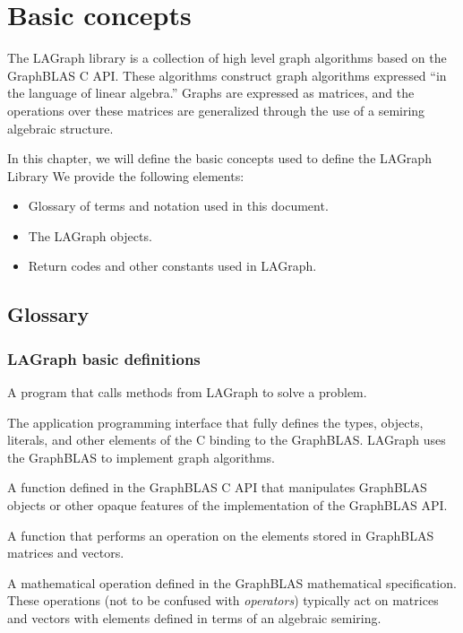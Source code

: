 \chapter{Basic concepts}
\label{Chp:Concepts}

The LAGraph library is a collection of high level graph algorithms
based on the GraphBLAS C API.  These algorithms construct  
graph algorithms expressed ``in the language of linear algebra.''
Graphs are expressed as matrices, and the operations over 
these matrices are generalized through the use of a
semiring algebraic structure.

In this chapter, we will define the basic concepts used to
define the LAGraph Library  We provide the following elements:

\begin{itemize}
\item Glossary of terms and notation used in this document.  
\item The LAGraph objects. 
\item Return codes and other constants used in LAGraph.
\end{itemize}

\section{Glossary}


\subsection{LAGraph basic definitions}

\glossBegin

 A program that calls methods from LAGraph to
solve a problem.

 The application programming interface that fully defines the types, objects, 
literals, and other elements of the C binding to the GraphBLAS.  LAGraph uses the GraphBLAS to
implement graph algorithms.

 A function defined in the GraphBLAS C API that manipulates
GraphBLAS objects or other opaque features of the implementation of the GraphBLAS API.

 A function that performs an operation on the elements stored in GraphBLAS matrices and vectors.

 A mathematical operation defined in the
GraphBLAS mathematical specification. These operations (not to be confused with \emph{operators}) typically act
on matrices and vectors with elements defined in terms of an algebraic semiring. 
\glossEnd

